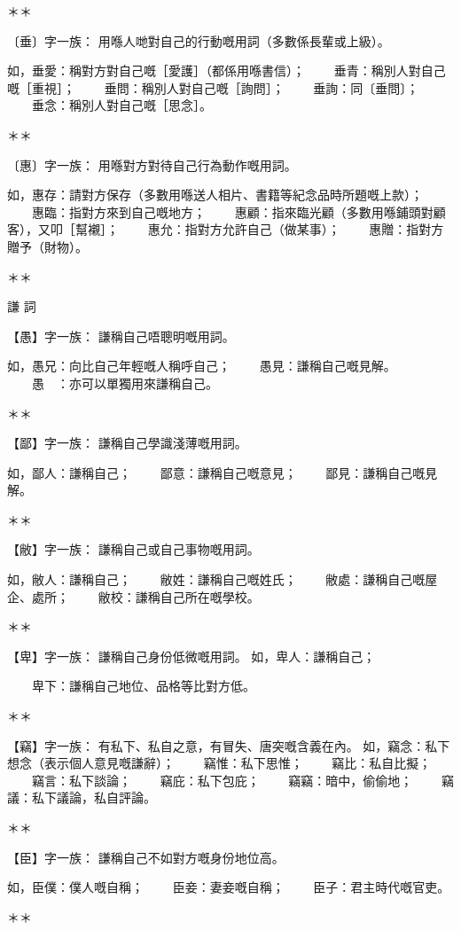 ＊＊  
  
〔垂〕字一族：  
用喺人哋對自己的行動嘅用詞（多數係長輩或上級）。

如，垂愛：稱對方對自己嘅［愛護］（都係用喺書信）；  
　　垂青：稱別人對自己嘅［重視］；  
　　垂問：稱別人對自己嘅［詢問］；  
　　垂詢：同〔垂問〕；  
　　垂念：稱別人對自己嘅［思念］。  
  
＊＊  
  
〔惠〕字一族：  
用喺對方對待自己行為動作嘅用詞。

如，惠存：請對方保存（多數用喺送人相片、書籍等紀念品時所題嘅上款）；  
　　惠臨：指對方來到自己嘅地方；  
　　惠顧：指來臨光顧（多數用喺鋪頭對顧客），又叩［幫襯］；  
　　惠允：指對方允許自己（做某事）；  
　　惠贈：指對方贈予（財物）。  
  
＊＊  
  
謙 詞  
  
【愚】字一族：  
謙稱自己唔聰明嘅用詞。

如，愚兄：向比自己年輕嘅人稱呼自己；  
　　愚見：謙稱自己嘅見解。  
　　愚　：亦可以單獨用來謙稱自己。  
  
＊＊  
  
【鄙】字一族：  
謙稱自己學識淺薄嘅用詞。

如，鄙人：謙稱自己；  
　　鄙意：謙稱自己嘅意見；  
　　鄙見：謙稱自己嘅見解。  
  
＊＊  
  
【敝】字一族：  
謙稱自己或自己事物嘅用詞。

如，敝人：謙稱自己；  
　　敝姓：謙稱自己嘅姓氏；  
　　敝處：謙稱自己嘅屋企、處所；  
　　敝校：謙稱自己所在嘅學校。  
  
＊＊  
  
【卑】字一族：  
謙稱自己身份低微嘅用詞。  
如，卑人：謙稱自己；

　　卑下：謙稱自己地位、品格等比對方低。  
  
＊＊  
  
【竊】字一族：  
有私下、私自之意，有冒失、唐突嘅含義在內。  
如，竊念：私下想念（表示個人意見嘅謙辭）；  
　　竊惟：私下思惟；  
　　竊比：私自比擬；  
　　竊言：私下談論；  
　　竊庇：私下包庇；  
　　竊竊：暗中，偷偷地；  
　　竊議：私下議論，私自評論。  
  
＊＊  

  
【臣】字一族：  
謙稱自己不如對方嘅身份地位高。

如，臣僕：僕人嘅自稱；  
　　臣妾：妻妾嘅自稱；  
　　臣子：君主時代嘅官吏。  
  
＊＊  

